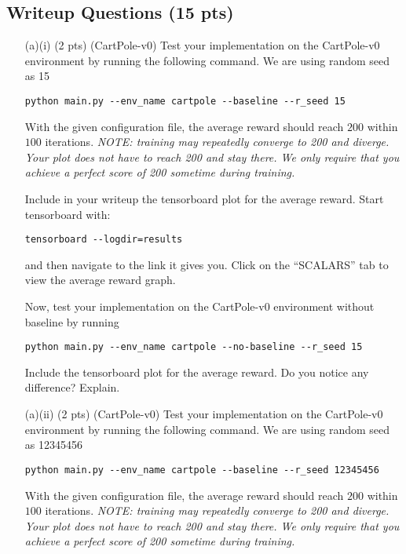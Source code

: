 \documentclass{article}
\begin{document}
\subsection{Writeup Questions (15 pts)}
\begin{enumerate}
\item[(a)(i) (2 pts)] (CartPole-v0)
Test your implementation on the CartPole-v0 environment by running the following command. We are using random seed as 15
\begin{tcolorbox}
\begin{verbatim}
python main.py --env_name cartpole --baseline --r_seed 15
\end{verbatim}
\end{tcolorbox}
With the given configuration file, the average reward should reach $200$ within $100$ iterations. \emph{NOTE: training may repeatedly converge to 200 and diverge. Your plot does not have to reach 200 and stay there. We only require that you achieve a perfect score of 200 sometime during training.}

Include in your writeup the tensorboard plot for the average reward. Start tensorboard with:
\begin{tcolorbox}
\begin{verbatim}
tensorboard --logdir=results
\end{verbatim}
\end{tcolorbox}
and then navigate to the link it gives you. Click on the ``SCALARS'' tab to view the average reward graph.

Now, test your implementation on the CartPole-v0 environment without baseline by running
\begin{tcolorbox}
\begin{verbatim}
python main.py --env_name cartpole --no-baseline --r_seed 15
\end{verbatim}
\end{tcolorbox}
Include the tensorboard plot for the average reward. Do you notice any difference? Explain.

\item[(a)(ii) (2 pts)] (CartPole-v0)
Test your implementation on the CartPole-v0 environment by running the following command. We are using random seed as 12345456
\begin{tcolorbox}
\begin{verbatim}
python main.py --env_name cartpole --baseline --r_seed 12345456
\end{verbatim}
\end{tcolorbox}
With the given configuration file, the average reward should reach $200$ within $100$ iterations. \emph{NOTE: training may repeatedly converge to 200 and diverge. Your plot does not have to reach 200 and stay there. We only require that you achieve a perfect score of 200 sometime during training.}


\end{enumerate}
\end{document}
